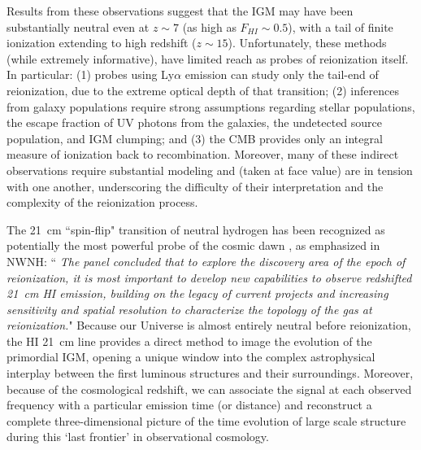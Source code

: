 \documentclass[preprint]{aastex}
\def\HI{{H{\small I }}}
\begin{document}
Results from these observations suggest that the IGM may have been substantially neutral even at $z \sim 7$ (as high as $F_{HI} \sim 0.5$), with a tail of finite ionization extending to high 
redshift ($z \sim 15$).  Unfortunately, these methods (while extremely informative), have limited 
reach as probes of reionization itself. In particular:
(1) probes using Ly$\alpha$ emission can study only the tail-end of reionization, 
due to the extreme optical depth of that transition; (2) inferences from galaxy populations require strong assumptions 
regarding stellar populations, the escape fraction of UV photons from the galaxies, the undetected source population, 
and IGM clumping; and (3) the CMB provides only an integral measure of ionization back to recombination. 
Moreover, many of these indirect observations require substantial modeling and (taken at face value) 
are in tension with one another, underscoring the difficulty of
their interpretation and the complexity of the reionization process.

The 21~cm ``spin-flip" transition of  neutral hydrogen has been recognized as potentially the most powerful probe 
of the cosmic dawn \citep{morales_wyithe2010, furlanetto_et_al2006}, as emphasized in NWNH: 
``{\it 
The panel concluded that  to explore the discovery area of the epoch of reionization, it is most important to 
develop new capabilities to observe redshifted 21~cm \HI emission, building on the legacy of current projects and 
increasing sensitivity and spatial resolution to characterize the topology of the gas at reionization.}"  Because 
our Universe is almost entirely neutral before reionization, the HI 21~cm line provides a direct method to image 
the evolution of the primordial IGM, opening a unique window into the complex astrophysical interplay between the 
first luminous structures and their surroundings. Moreover, because of the cosmological redshift, we can associate 
the signal at each observed frequency with a particular emission time (or distance) and reconstruct a complete 
three-dimensional picture of the time evolution of large scale structure during this `last frontier' in 
observational cosmology. 

\end{document}
